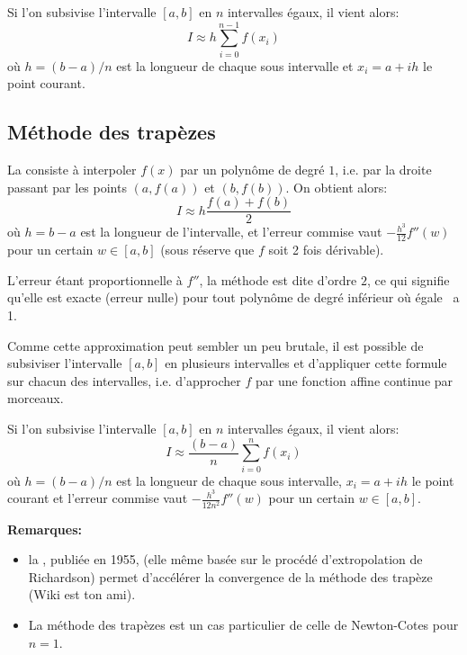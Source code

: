 Si l'on subsivise l'intervalle $[a,b]$ en $n$ intervalles égaux, il vient alors:
\begin{equation}I\approx h\sum_{i=0}^{n-1} f(x_i)\end{equation}
où $h=(b-a)/n$ est la longueur de chaque sous intervalle et $x_i=a+ih$ le
point courant.




\medskip
\subsection*{Méthode des trapèzes}

La  consiste à interpoler $f(x)$ par un polynôme 
de degré $1$, i.e. par la droite passant par les points $(a,f(a))$ et $(b,f(b))$.
On obtient alors:
\begin{equation} I\approx h\dfrac{f(a)+f(b)}2\end{equation}
où $h=b-a$ est la longueur de l'intervalle,
et l'erreur commise vaut $-\frac{h^3}{12} f''(w)$ pour un certain $w\in[a,b]$
(sous réserve que $f$ soit 2 fois dérivable).

L'erreur étant proportionnelle à $f''$, la méthode est dite d'ordre $2$, ce qui
signifie qu'elle est exacte (erreur nulle) pour tout polynôme de degré inférieur
où égale \ a 1.

\medskip
Comme cette approximation peut sembler un peu brutale, il est possible de subsiviser
l'intervalle $[a,b]$ en plusieurs intervalles et d'appliquer cette formule sur chacun
des intervalles, i.e. d'approcher $f$ par une fonction affine continue par morceaux.

Si l'on subsivise l'intervalle $[a,b]$ en $n$ intervalles égaux, il vient alors:
\begin{equation}I\approx \frac{(b-a)}{n}\sum_{i=0}^{n}f(x_i)\end{equation}
où $h=(b-a)/n$ est la longueur de chaque sous intervalle, $x_i=a+ih$ le
point courant et l'erreur commise vaut $-\frac{h^3}{12n^2} f''(w)$ pour un certain $w\in[a,b]$.

\medskip
\textbf{Remarques:}
\begin{itemize}
\item la , publiée en 1955,
(elle même basée sur le procédé d'extropolation de Richardson)
permet d'accélérer la convergence de la méthode des trapèze (Wiki est ton ami).
\item La méthode des trapèzes est un cas particulier de celle de Newton-Cotes pour $n=1$.
\end{itemize}

